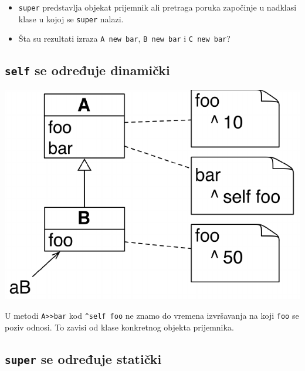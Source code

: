 \documentclass[presentation]{beamer}
\begin{document}
\begin{itemize}
\item \texttt{super} predstavlja objekat prijemnik ali pretraga poruka započinje u nadklasi
klase u kojoj se \texttt{super} nalazi.
\item Šta su rezultati izraza \texttt{A new bar}, \texttt{B new bar} i \texttt{C new bar}?
\end{itemize}

\subsection{\texttt{self} se određuje dinamički}
\label{sec:orga0a52ff}

\begin{center}
\includegraphics[width=.9\linewidth]{./slike/self_example.png}
\end{center}
U metodi \texttt{A>>bar} kod \texttt{\textasciicircum{}self foo} ne znamo do vremena izvršavanja na koji \texttt{foo}
se poziv odnosi. To zavisi od klase konkretnog objekta prijemnika.

\subsection{\texttt{super} se određuje statički}
\label{sec:org8f20f56}
\end{document}

